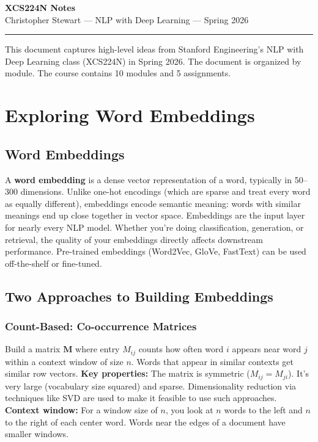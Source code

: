 \documentclass[11pt]{article}
\begin{document}
\begin{center}
{\Large \textbf{XCS224N Notes}}\\[4pt]
{\small Christopher Stewart --- NLP with Deep Learning --- Spring 2026}
\end{center}
\vspace{2\baselineskip}
\vspace{-4pt}
\hrule
\vspace{4pt}
\vspace{2\baselineskip}
{\small This document captures high-level ideas from Stanford Engineering's NLP with Deep Learning class (XCS224N) in Spring 2026. The document is organized by module. The course contains 10 modules and 5 assignments.}
\section{Exploring Word Embeddings}
\subsection{Word Embeddings}
A \textbf{word embedding} is a dense vector representation of a word, typically in 50--300 dimensions. Unlike one-hot encodings (which are sparse and treat every word as equally different), embeddings encode semantic meaning: words with similar meanings end up close together in vector space.
Embeddings are the input layer for nearly every NLP model. Whether you're doing classification, generation, or retrieval, the quality of your embeddings directly affects downstream performance. Pre-trained embeddings (Word2Vec, GloVe, FastText) can be used off-the-shelf or fine-tuned.
\subsection{Two Approaches to Building Embeddings}
\subsubsection{Count-Based: Co-occurrence Matrices}
Build a matrix $\mathbf{M}$ where entry $M_{ij}$ counts how often word $i$ appears near word $j$ within a context window of size $n$. Words that appear in similar contexts get similar row vectors.
\textbf{Key properties:}
The matrix is symmetric ($M_{ij} = M_{ji}$). It's very large (vocabulary size squared) and sparse. Dimensionality reduction via techniques like SVD are used to make it feasible to use such approaches.
\textbf{Context window:} For a window size of $n$, you look at $n$ words to the left and $n$ to the right of each center word. Words near the edges of a document have smaller windows.
\end{document}
